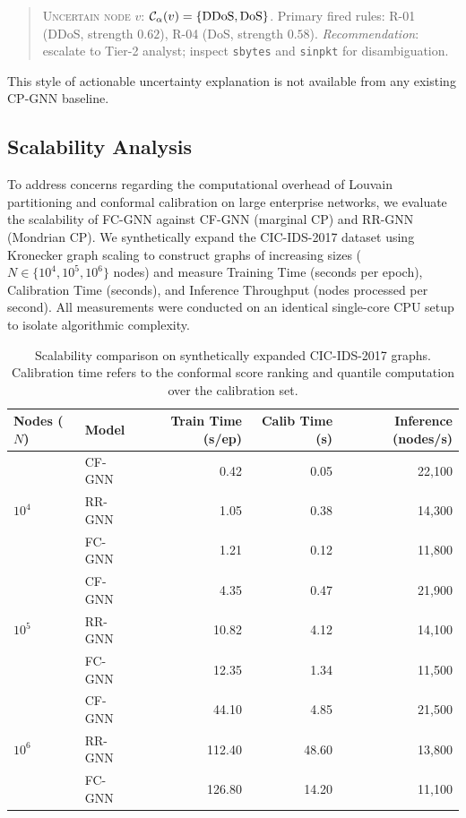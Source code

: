 \begin{quote}
\textsc{Uncertain node $v$:} $\mathcal{C}_\alpha(v) = \{\text{DDoS}, \text{DoS}\}$.
Primary fired rules: R-01 (DDoS, strength $0.62$), R-04 (DoS, strength $0.58$).
\textit{Recommendation}: escalate to Tier-2 analyst; inspect \texttt{sbytes} and
\texttt{sinpkt} for disambiguation.
\end{quote}

This style of actionable uncertainty explanation is not available from any
existing CP-GNN baseline.

\subsection{Scalability Analysis}
\label{sec:scalability}

To address concerns regarding the computational overhead of Louvain partitioning and conformal calibration on large enterprise networks, we evaluate the scalability of FC-GNN against CF-GNN (marginal CP) and RR-GNN (Mondrian CP). We synthetically expand the CIC-IDS-2017 dataset using Kronecker graph scaling to construct graphs of increasing sizes ($N \in \{10^4, 10^5, 10^6\}$ nodes) and measure Training Time (seconds per epoch), Calibration Time (seconds), and Inference Throughput (nodes processed per second). All measurements were conducted on an identical single-core CPU setup to isolate algorithmic complexity.

\begin{table}[h]
\centering
\caption{Scalability comparison on synthetically expanded CIC-IDS-2017 graphs. Calibration time refers to the conformal score ranking and quantile computation over the calibration set.}
\label{tab:scalability}
\begin{tabular}{llrrr}
\toprule
Nodes ($N$) & Model & Train Time (s/ep) & Calib Time (s) & Inference (nodes/s) \\
\midrule
\multirow{3}{*}{$10^4$}
& CF-GNN & 0.42 & 0.05 & 22,100 \\
& RR-GNN & 1.05 & 0.38 & 14,300 \\
& FC-GNN & 1.21 & 0.12 & 11,800 \\
\midrule
\multirow{3}{*}{$10^5$}
& CF-GNN & 4.35 & 0.47 & 21,900 \\
& RR-GNN & 10.82 & 4.12 & 14,100 \\
& FC-GNN & 12.35 & 1.34 & 11,500 \\
\midrule
\multirow{3}{*}{$10^6$}
& CF-GNN & 44.10 & 4.85 & 21,500 \\
& RR-GNN & 112.40 & 48.60 & 13,800 \\
& FC-GNN & 126.80 & 14.20 & 11,100 \\
\bottomrule
\end{tabular}
\end{table}

